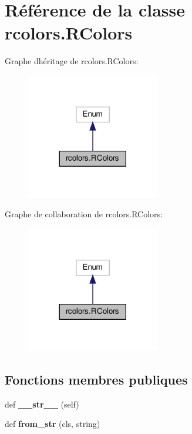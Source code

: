 \hypertarget{classrcolors_1_1RColors}{}\section{Référence de la classe rcolors.\+R\+Colors}
\label{classrcolors_1_1RColors}


Graphe d\textquotesingle{}héritage de rcolors.\+R\+Colors\+:
\nopagebreak
\begin{figure}[H]
\begin{center}
\leavevmode
\includegraphics[width=165pt]{classrcolors_1_1RColors__inherit__graph}
\end{center}
\end{figure}


Graphe de collaboration de rcolors.\+R\+Colors\+:
\nopagebreak
\begin{figure}[H]
\begin{center}
\leavevmode
\includegraphics[width=165pt]{classrcolors_1_1RColors__coll__graph}
\end{center}
\end{figure}
\subsection*{Fonctions membres publiques}
\begin{DoxyCompactItemize}
\item 
\mbox{\label{classrcolors_1_1RColors_ab8014c6c1a797ab32c7aa78633efb708}} 
def {\bfseries \+\_\+\+\_\+str\+\_\+\+\_\+} (self)
\item 
\mbox{\label{classrcolors_1_1RColors_a05522a9a34974e215921dc130cba1ded}} 
def {\bfseries from\+\_\+str} (cls, string)
\end{DoxyCompactItemize}
